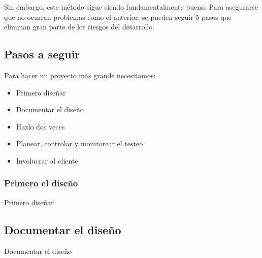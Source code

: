 \documentclass{beamer}
\begin{document}
\begin{frame}[fragile]

Sin embargo, este método sigue siendo fundamentalmente bueno. Para asegurarse que no ocurran problemas como el anterior, se pueden seguir 5 pasos que eliminan gran parte de los riesgos del desarrollo.

\end{frame}

\subsection{Pasos a seguir}
\begin{frame}
Para hacer un proyecto más grande necesitamos:

\begin{itemize}
\item Primero diseñar %
\item Documentar el diseño %
\item Hazlo dos veces %
\item Planear, controlar y monitorear el testeo %
\item Involucrar al cliente %
\end{itemize}

\end{frame}

\subsubsection{Primero el diseño}

\begin{frame}{Primero diseñar}

\end{frame}

\subsection{Documentar el diseño}

\begin{frame}{Documentar el diseño}

\end{frame}
\end{document}
